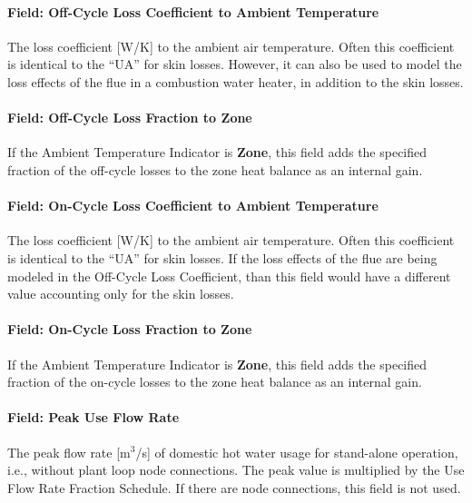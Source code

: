\paragraph{Field: Off-Cycle Loss Coefficient to Ambient Temperature}\label{field-off-cycle-loss-coefficient-to-ambient-temperature}

The loss coefficient {[}W/K{]} to the ambient air temperature. Often this coefficient is identical to the ``UA'' for skin losses. However, it can also be used to model the loss effects of the flue in a combustion water heater, in addition to the skin losses.

\paragraph{Field: Off-Cycle Loss Fraction to Zone}\label{field-off-cycle-loss-fraction-to-zone}

If the Ambient Temperature Indicator is \textbf{Zone}, this field adds the specified fraction of the off-cycle losses to the zone heat balance as an internal gain.

\paragraph{Field: On-Cycle Loss Coefficient to Ambient Temperature}\label{field-on-cycle-loss-coefficient-to-ambient-temperature}

The loss coefficient {[}W/K{]} to the ambient air temperature. Often this coefficient is identical to the ``UA'' for skin losses. If the loss effects of the flue are being modeled in the Off-Cycle Loss Coefficient, than this field would have a different value accounting only for the skin losses.

\paragraph{Field: On-Cycle Loss Fraction to Zone}\label{field-on-cycle-loss-fraction-to-zone}

If the Ambient Temperature Indicator is \textbf{Zone}, this field adds the specified fraction of the on-cycle losses to the zone heat balance as an internal gain.

\paragraph{Field: Peak Use Flow Rate}\label{field-peak-use-flow-rate}

The peak flow rate {[}m\(^{3}\)/s{]} of domestic hot water usage for stand-alone operation, i.e., without plant loop node connections. The peak value is multiplied by the Use Flow Rate Fraction Schedule. If there are node connections, this field is not used.

